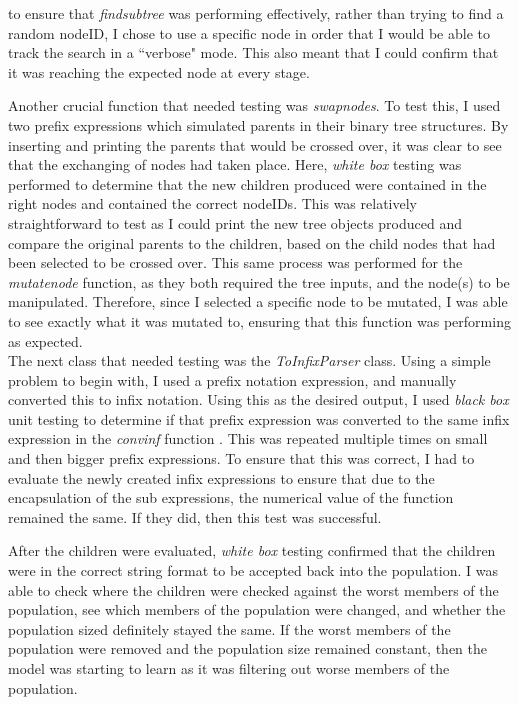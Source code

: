 \documentclass[11pt]{article}
\begin{document}
to ensure that \textit{find\textunderscore subtree} was performing effectively, rather than trying to find a random nodeID, I chose to use a specific node in order that I would be able to track the search in a ``verbose" mode. This also meant that I could confirm that it was reaching the expected node at every stage.

Another crucial function that needed testing was \textit{swap\textunderscore nodes}. To test this, I used two prefix expressions which simulated parents in their binary tree structures. By inserting and printing the parents that would be crossed over, it was clear to see that the exchanging of nodes had taken place. Here, \textit{white box} testing was performed to determine that the new children produced were contained in the right nodes and contained the correct nodeIDs. This was relatively straightforward to test as I could print the new tree objects produced and compare the original parents to the children, based on the child nodes that had been selected to be crossed over.  This same process was performed for the \textit{mutate\textunderscore node} function, as they both required the tree inputs, and the node(s) to be manipulated. Therefore, since I selected a specific node to be mutated, I was able to see exactly what it was mutated to, ensuring that this function was performing as expected.\\
The next class that needed testing was the \textit{ToInfixParser} class. Using a simple problem to begin with, I used a prefix notation expression, and manually converted this to infix notation. Using this as the desired output, I used \textit{black box} unit testing to determine if that prefix expression was converted to the same infix expression in the \textit{conv\textunderscore inf}  function . This was repeated multiple times on small and then bigger prefix expressions. To ensure that this was correct, I had to evaluate the newly created infix expressions to ensure that due to the encapsulation of the sub expressions, the numerical value of the function remained the same. If they did, then this test was successful. 

After the children were evaluated, \textit{white box} testing confirmed that the children were in the correct string format to be accepted back into the population. I was able to check where the children were checked against the worst members of the population, see which members of the population were changed, and whether the population sized definitely stayed the same. If the worst members of the population were removed and the population size remained constant, then the model was starting to learn as it was filtering out worse members of the population. 
\end{document}
